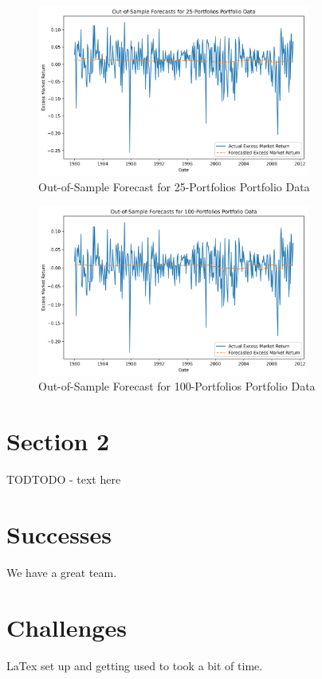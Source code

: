\documentclass[12pt]{article}
\begin{document}
\begin{figure}[h]
    \centering
    \includegraphics[width=0.8\textwidth]{plots/Out_of_Sample_Forecasts_for_25_Portfolios_Portfolio_Data.png}
    \caption{Out-of-Sample Forecast for 25-Portfolios Portfolio Data}
    \label{fig:forecast_chart}
\end{figure}

\begin{figure}[h]
    \centering
    \includegraphics[width=0.8\textwidth]{plots/Out_of_Sample_Forecasts_for_100_Portfolios_Portfolio_Data.png}
    \caption{Out-of-Sample Forecast for 100-Portfolios Portfolio Data}
    \label{fig:forecast_chart}
\end{figure}



\doublespacing
\section{Section 2}

TODTODO - text here


\doublespacing
\section{Successes}

We have a great team. 



\doublespacing
\section{Challenges}

LaTex set up and getting used to took a bit of time. 
\end{document}
